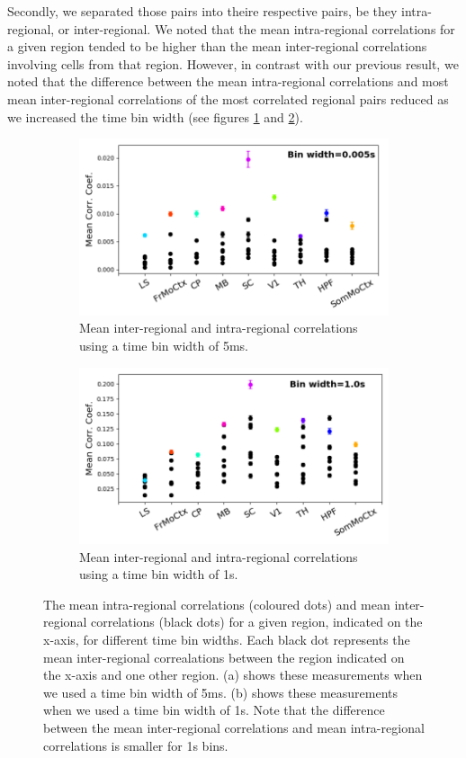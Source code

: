 \documentclass[a4paper,12pt]{article}
\theoremstyle{definition}
\begin{document}
  Secondly, we separated those pairs into theire respective pairs, be they intra-regional, or inter-regional.  We noted that the mean intra-regional correlations for a given region tended to be higher than the mean inter-regional correlations involving cells from that region. However, in contrast with our previous result, we noted that the difference between the mean intra-regional correlations and most mean inter-regional correlations of the most correlated regional pairs reduced as we increased the time bin width (see figures \ref{fig:short_bin_corr_comp} and \ref{fig:long_bin_corr_comp}).

  \newpage

  \begin{figure}[h]
    \begin{subfigure}[h]{\linewidth}
      \centering
      \includegraphics[width=0.7\linewidth]{figures/Krebs_0p005_corr_comp.png}
      \caption{Mean inter-regional and intra-regional correlations using a time bin width of 5ms.}
      \label{fig:short_bin_corr_comp}
    \end{subfigure}
    \begin{subfigure}[h]{\linewidth}
      \centering
      \includegraphics[width=0.7\linewidth]{figures/Krebs_1p0_corr_comp.png}
      \caption{Mean inter-regional and intra-regional correlations using a time bin width of 1s.}
      \label{fig:long_bin_corr_comp}
    \end{subfigure}
    \caption{The mean intra-regional correlations (coloured dots) and mean inter-regional correlations (black dots) for a given region, indicated on the x-axis, for different time bin widths. Each black dot represents the mean inter-regional correalations between the region indicated on the x-axis and one other region. (a) shows these measurements when we used a time bin width of 5ms. (b) shows these measurements when we used a time bin width of 1s. Note that the difference between the mean inter-regional correlations and mean intra-regional correlations is smaller for 1s bins.}
    \label{fig:corr_comps}
  \end{figure}
\end{document}
